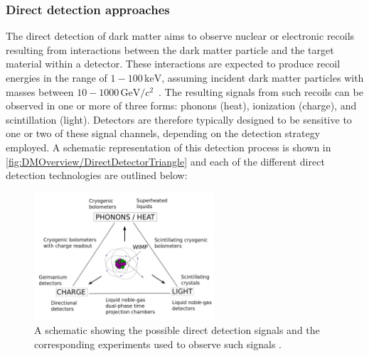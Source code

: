 \pagebreak

\subsubsection{Direct detection approaches}
The direct detection of dark matter aims to observe nuclear or electronic recoils resulting from interactions between the dark matter particle and the target material within a detector. These interactions are expected to produce recoil energies in the range of $1-100\,\mathrm{keV}$, assuming incident dark matter particles with masses between $10-1000\,\mathrm{GeV}/c^2$~\cite{DirectDetection2015}. The resulting signals from such recoils can be observed in one or more of three forms: phonons (heat), ionization (charge), and scintillation (light). Detectors are therefore typically designed to be sensitive to one or two of these signal channels, depending on the detection strategy employed. A schematic representation of this detection process is shown in \autoref{fig:DMOverview/DirectDetectorTriangle} and each of the different direct detection technologies are outlined below:
\begin{figure}[ht!]
	\centering
	\includegraphics[width=0.6\textwidth]{figures/DMOverview/Direct_direction.png}
	\caption[A schematic showing the possible direct detection signals with corresponding experiments.]{A schematic showing the possible direct detection signals and the corresponding experiments used to observe such signals \cite{DirectDetection2015}.}
	\label{fig:DMOverview/DirectDetectorTriangle}
\end{figure}

